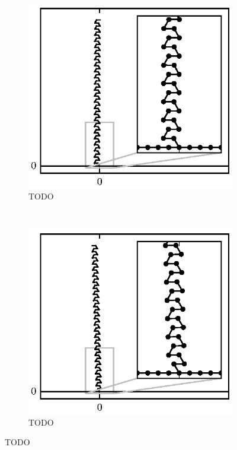 	\begin{figure}
		\centering
		\begin{subfigure}{.5\textwidth}
			\centering
			\includegraphics{./fig/ch3/fs/b0.1_eb0.5.eps}
			\caption{TODO \label{subfig:fs_crystal1}}
		\end{subfigure}%
		~
		\begin{subfigure}{.5\textwidth}
			\centering
			\includegraphics{./fig/ch3/fs/b0.1_eb3.eps}
			\caption{TODO \label{subfig:fs_crystal2}}
		\end{subfigure}


\end{figure}
